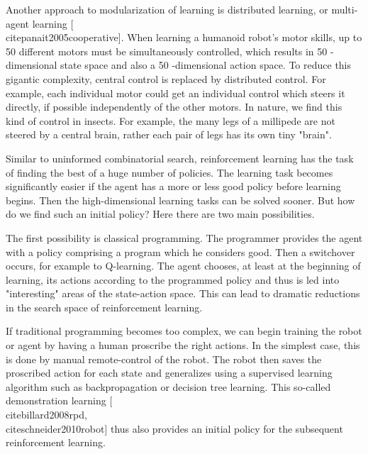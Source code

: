 \documentclass[10pt]{book}
\begin{document}
Another approach to modularization of learning is distributed learning, or multi-agent learning [\\cite{panait2005cooperative}]. When learning a humanoid robot's motor skills, up to 50 different motors must be simultaneously controlled, which results in 50 -dimensional state space and also a 50 -dimensional action space. To reduce this gigantic complexity, central control is replaced by distributed control. For example, each individual motor could get an individual control which steers it directly, if possible independently of the other motors. In nature, we find this kind of control in insects. For example, the many legs of a millipede are not steered by a central brain, rather each pair of legs has its own tiny "brain".

Similar to uninformed combinatorial search, reinforcement learning has the task of finding the best of a huge number of policies. The learning task becomes significantly easier if the agent has a more or less good policy before learning begins. Then the high-dimensional learning tasks can be solved sooner. But how do we find such an initial policy? Here there are two main possibilities.

The first possibility is classical programming. The programmer provides the agent with a policy comprising a program which he considers good. Then a switchover occurs, for example to Q-learning. The agent chooses, at least at the beginning of learning, its actions according to the programmed policy and thus is led into "interesting" areas of the state-action space. This can lead to dramatic reductions in the search space of reinforcement learning.

If traditional programming becomes too complex, we can begin training the robot or agent by having a human proscribe the right actions. In the simplest case, this is done by manual remote-control of the robot. The robot then saves the proscribed action for each state and generalizes using a supervised learning algorithm such as backpropagation or decision tree learning. This so-called demonstration learning [\\cite{billard2008rpd}, \\cite{schneider2010robot}] thus also provides an initial policy for the subsequent reinforcement learning.
\end{document}
